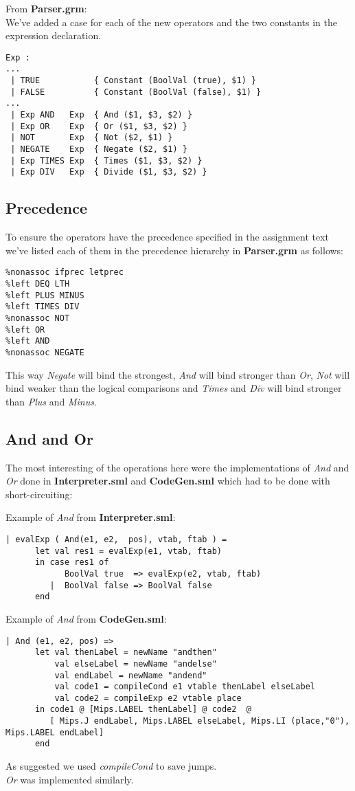 \documentclass{article}
\begin{document}
\noindent From \textbf{Parser.grm}:\\
\noindent We've added a case for each of the new operators and the two constants in the expression declaration.
\begin{lstlisting}
Exp :
...
 | TRUE           { Constant (BoolVal (true), $1) }
 | FALSE          { Constant (BoolVal (false), $1) }
...
 | Exp AND   Exp  { And ($1, $3, $2) }
 | Exp OR    Exp  { Or ($1, $3, $2) }
 | NOT       Exp  { Not ($2, $1) }
 | NEGATE    Exp  { Negate ($2, $1) }
 | Exp TIMES Exp  { Times ($1, $3, $2) }
 | Exp DIV   Exp  { Divide ($1, $3, $2) }
\end{lstlisting}

\subsection{Precedence}
To ensure the operators have the precedence specified in the assignment text we've listed each of them in the precedence hierarchy in \textbf{Parser.grm} as follows: 
\begin{lstlisting}
%nonassoc ifprec letprec
%left DEQ LTH
%left PLUS MINUS
%left TIMES DIV
%nonassoc NOT
%left OR
%left AND
%nonassoc NEGATE
\end{lstlisting}
This way \textit{Negate} will bind the strongest, \textit{And} will bind stronger than \textit{Or}, \textit{Not} will bind weaker than the logical comparisons and \textit{Times} and \textit{Div} will bind stronger than \textit{Plus} and \textit{Minus}.

\subsection{And and Or}
The most interesting of the operations here were the implementations of \textit{And} and \textit{Or} done in \textbf{Interpreter.sml} and \textbf{CodeGen.sml} which had to be done with short-circuiting:

\noindent Example of \textit{And} from \textbf{Interpreter.sml}:
\begin{lstlisting}
| evalExp ( And(e1, e2,  pos), vtab, ftab ) =
      let val res1 = evalExp(e1, vtab, ftab)
      in case res1 of
            BoolVal true  => evalExp(e2, vtab, ftab)
         |  BoolVal false => BoolVal false
      end
\end{lstlisting}

\noindent Example of \textit{And} from \textbf{CodeGen.sml}:
\begin{lstlisting}
| And (e1, e2, pos) =>
      let val thenLabel = newName "andthen"
          val elseLabel = newName "andelse"
          val endLabel = newName "andend"
          val code1 = compileCond e1 vtable thenLabel elseLabel
          val code2 = compileExp e2 vtable place
      in code1 @ [Mips.LABEL thenLabel] @ code2  @
         [ Mips.J endLabel, Mips.LABEL elseLabel, Mips.LI (place,"0"), Mips.LABEL endLabel]
      end
\end{lstlisting}
\noindent As suggested we used \textit{compileCond} to save jumps.
\\
\textit{Or} was implemented similarly.
\end{document}
